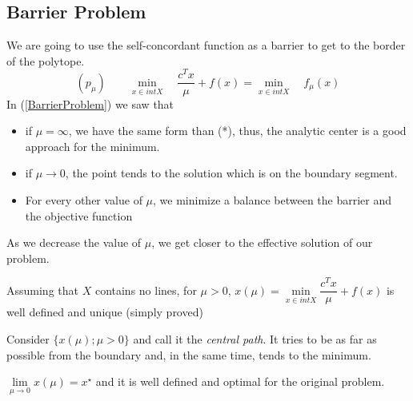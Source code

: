 \subsection{Barrier Problem} 
We are going to use the self-concordant function as a barrier to get to the border of the polytope.
\begin{equation}
\label{BarrierProblem}
(p_{\mu}) \qquad \underset{x \in int X}{\min} \quad \dfrac{c^T x}{\mu} + f(x) = \underset{x \in int X}{\min} \quad f_{\mu}(x)
\end{equation}
In (\ref{BarrierProblem}) we saw that
\begin{itemize}
\item if $\mu = \infty$, we have the same form than (*), thus, the analytic center is a good approach for the minimum.
\item if $\mu \rightarrow 0$, the point tends to the solution which is on the boundary segment.
\item For every other value of $\mu$, we minimize a balance between the barrier and the objective function
\end{itemize}
As we decrease the value of $\mu$, we get closer to the effective solution of our problem.
\newline
\begin{theorem}
Assuming that $X$ contains no lines, for $\mu > 0$, $x(\mu) = \underset{x \in int X}{\min} \dfrac{c^T x}{\mu} + f(x)$ is well defined and unique (simply proved)
\end{theorem}
Consider $\lbrace x(\mu) ; \mu > 0 \rbrace$ and call it the \textit{central path}. It tries to be as far as possible from the boundary  and, in the same time, tends to the minimum.\\

\begin{property}
$\underset{\mu \rightarrow 0}{\lim} x(\mu) = x^{\star}$ and it is well defined and optimal for the original problem.
\end{property} 

